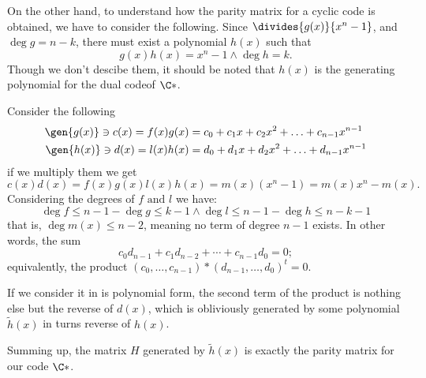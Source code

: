 \documentclass{subfiles}
\begin{document}
    On the other hand, to understand how the parity matrix for a cyclic code is obtained,
        we have to consider the following. Since \(\divides{g(x)}{x^{n} - 1}\), 
        and \(\deg g = n - k\), there must exist a polynomial \(h(x)\) such that 
        \[
            g(x)h(x) = x^{n} -1 \land \deg h = k.
        \]
        Though we don't descibe them, it should be noted that \(h(x)\) is the generating polynomial 
        for the dual code\footnotemark of \(\C*\). 

    Consider the following
        \[\begin{aligned}
            \gen{g(x)} \ni c(x) = f(x)g(x) & = c_{0} + c_{1}x + c_{2}x^{2} + \ldots + c_{n - 1}x^{n - 1} \\
            \gen{h(x)} \ni d(x) = l(x)h(x) & = d_{0} + d_{1}x + d_{2}x^{2} + \ldots + d_{n - 1}x^{n - 1} \\
        \end{aligned}\]
        if we multiply them we get 
        \[
            c(x)d(x) = f(x)g(x)l(x)h(x) = m(x)(x^{n} - 1) = m(x)x^{n} - m(x).
        \]
        Considering the degrees of \(f \text{ and } l\) we have:
        \[
            \deg f \le n - 1 - \deg g \le k - 1 \land \deg l \le n - 1 - \deg h \le n - k - 1
        \]
        that is, \(\deg m(x) \le n - 2\), meaning no term of degree \(n - 1\) exists.
        In other words, the sum 
        \[
            c_{0}d_{n - 1} + c_{1}d_{n - 2} + \cdots + c_{n - 1}d_{0} = 0;
        \]
        equivalently, the product \((c_{0}, \ldots, c_{n - 1}) * (d_{n - 1}, \ldots, d_{0})^{t} = 0\).

        If we consider it in is polynomial form, the second term of the product is nothing else but 
            the reverse of \(d(x)\), which is obliviously generated by some polynomial \(\tilde{h}(x)\)
            in turns reverse of \(h(x)\). 

        Summing up, the matrix \(H\) generated by \(\tilde{h}(x)\) is exactly the parity matrix for our code \(\C*\).

\end{document}

